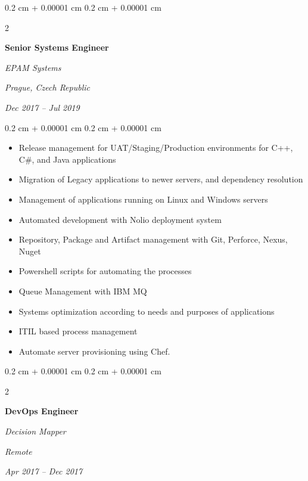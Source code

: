 \documentclass[10pt, letterpaper]{article}
\newenvironment{highlights}{
  \begin{itemize}[
        topsep=0.10 cm,
        parsep=0.10 cm,
        partopsep=0pt,
        itemsep=0pt,
        leftmargin=0.4 cm + 10pt
      ]
    }{
  \end{itemize}
} %
\newenvironment{onecolentry}{
  \begin{adjustwidth}{
      0.2 cm + 0.00001 cm
    }{
      0.2 cm + 0.00001 cm
    }
  }{
  \end{adjustwidth}
} %
\newenvironment{twocolentry}[2][]{
  \onecolentry
  \def\secondColumn{#2}
  \setcolumnwidth{\fill, 4.5 cm}
  \begin{paracol}{2}
  }{
    \switchcolumn \raggedleft \secondColumn
  \end{paracol}
  \endonecolentry
} %
\begin{document}
\vspace{0.3 cm}

\begin{twocolentry}{
    \textit{Prague, Czech Republic}

  \textit{Dec 2017 – Jul 2019}}
  \textbf{Senior Systems Engineer}

  \textit{EPAM Systems}
\end{twocolentry}

\vspace{0.2 cm}
\begin{onecolentry}
  \begin{highlights}
  \item Release management for UAT/Staging/Production environments
    for C++, C\#, and Java applications
  \item Migration of Legacy applications to newer servers, and
    dependency resolution
  \item Management of applications running on Linux and Windows servers
  \item Automated development with Nolio deployment system
  \item Repository, Package and Artifact management with Git,
    Perforce, Nexus, Nuget
  \item Powershell scripts for automating the processes
  \item Queue Management with IBM MQ
  \item Systems optimization according to needs and purposes of applications
  \item ITIL based process management
  \item Automate server provisioning using Chef.
  \end{highlights}
\end{onecolentry}

\vspace{0.3 cm}

\begin{twocolentry}{
    \textit{Remote}

  \textit{Apr 2017 – Dec 2017}}
  \textbf{DevOps Engineer}

  \textit{Decision Mapper}
\end{twocolentry}
\end{document}
